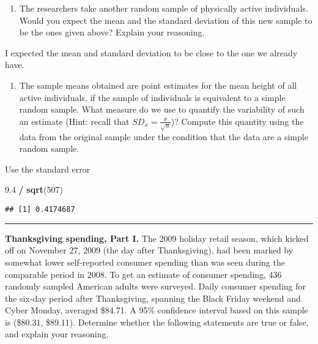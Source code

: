 \documentclass[
]{article}
\newenvironment{Shaded}{\begin{snugshade}}{\end{snugshade}}
\newcommand{\DecValTok}[1]{\textcolor[rgb]{0.00,0.00,0.81}{#1}}
\newcommand{\FloatTok}[1]{\textcolor[rgb]{0.00,0.00,0.81}{#1}}
\newcommand{\KeywordTok}[1]{\textcolor[rgb]{0.13,0.29,0.53}{\textbf{#1}}}
\newcommand{\NormalTok}[1]{#1}
\newcommand{\OperatorTok}[1]{\textcolor[rgb]{0.81,0.36,0.00}{\textbf{#1}}}
\newcommand{\StringTok}[1]{\textcolor[rgb]{0.31,0.60,0.02}{#1}}
\providecommand{\tightlist}{%
  \setlength{\itemsep}{0pt}\setlength{\parskip}{0pt}}
\begin{document}
\begin{enumerate}
\def\labelenumi{(\alph{enumi})}
\setcounter{enumi}{3}
\tightlist
\item
  The researchers take another random sample of physically active
  individuals. Would you expect the mean and the standard deviation of
  this new sample to be the ones given above? Explain your reasoning.
\end{enumerate}

I expected the mean and standard deviation to be close to the one we
already have.

\begin{enumerate}
\def\labelenumi{(\alph{enumi})}
\setcounter{enumi}{4}
\tightlist
\item
  The sample means obtained are point estimates for the mean height of
  all active individuals, if the sample of individuals is equivalent to
  a simple random sample. What measure do we use to quantify the
  variability of such an estimate (Hint: recall that
  \(SD_x = \frac{\sigma}{\sqrt{n}}\))? Compute this quantity using the
  data from the original sample under the condition that the data are a
  simple random sample.
\end{enumerate}

Use the standard error

\begin{Shaded}
\begin{Highlighting}[]
\FloatTok{9.4} \OperatorTok{/}\StringTok{ }\KeywordTok{sqrt}\NormalTok{(}\DecValTok{507}\NormalTok{)}
\end{Highlighting}
\end{Shaded}

\begin{verbatim}
## [1] 0.4174687
\end{verbatim}

\begin{center}\rule{0.5\linewidth}{0.5pt}\end{center}

\clearpage

\textbf{Thanksgiving spending, Part I.} The 2009 holiday retail season,
which kicked off on November 27, 2009 (the day after Thanksgiving), had
been marked by somewhat lower self-reported consumer spending than was
seen during the comparable period in 2008. To get an estimate of
consumer spending, 436 randomly sampled American adults were surveyed.
Daily consumer spending for the six-day period after Thanksgiving,
spanning the Black Friday weekend and Cyber Monday, averaged \$84.71. A
95\% confidence interval based on this sample is (\$80.31, \$89.11).
Determine whether the following statements are true or false, and
explain your reasoning.
\end{document}
